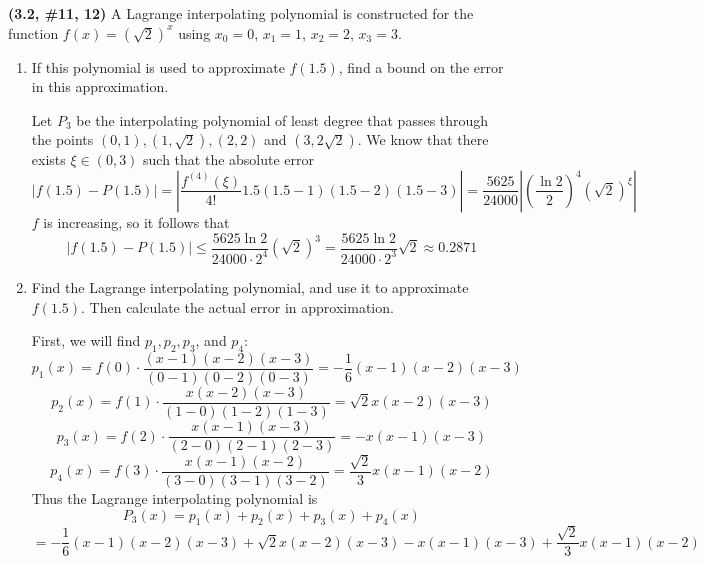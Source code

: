 \documentclass{eh-homework}
\begin{document}
    \begin{question}{6}
    \textbf{(3.2, \#11, 12)} A Lagrange interpolating polynomial is constructed for the function \(f(x) = (\sqrt{2})^x\) using \(x_0 = 0\), \(x_1 = 1\), \(x_2 = 2\), \(x_3 = 3\).
    
    \begin{enumerate}[label=\alph*.]
        \item If this polynomial is used to approximate \(f(1.5)\), find a bound on the error in this approximation.
        
        Let \(P_3\) be the interpolating polynomial of least degree that passes through the points \((0, 1), (1, \sqrt{2}), (2,2)\) and \((3, 2\sqrt{2})\). We know that there exists \(\xi \in (0,3)\) such that the absolute error
        \[
            |f(1.5) - P(1.5)| = \left\vert \frac{f^{(4)}(\xi)}{4!} 1.5(1.5-1)(1.5-2)(1.5-3) \right\vert = \frac{5625}{24000}\left\vert \left(\frac{\ln 2}{2}\right)^4(\sqrt{2})^{\xi} \right\vert 
        \]
        \(f\) is increasing, so it follows that
        \[
            |f(1.5) - P(1.5)| \leq \frac{5625\ln 2}{24000 \cdot 2^4}(\sqrt{2})^3 = \frac{5625\ln 2}{24000 \cdot 2^3}\sqrt{2} \approx 0.2871
        \]
    
        \item Find the Lagrange interpolating polynomial, and use it to approximate \(f(1.5)\). Then calculate the actual error in approximation.
        
        First, we will find \(p_1, p_2, p_3\), and \(p_4\):
        \[
            p_1(x) = f(0)\cdot \frac{(x - 1)(x-2)(x-3)}{(0 - 1)(0 - 2)(0 - 3)} = -\frac{1}{6}(x-1)(x-2)(x-3)
        \]
        \[
            p_2(x) = f(1) \cdot \frac{x(x-2)(x-3)}{(1-0)(1-2)(1-3)} = \sqrt{2}x(x-2)(x-3)
        \]
        \[
            p_3(x) = f(2) \cdot \frac{x(x-1)(x-3)}{(2-0)(2-1)(2-3)} = -x(x-1)(x-3)
        \]
        \[
            p_4(x) = f(3) \cdot \frac{x(x-1)(x-2)}{(3-0)(3-1)(3-2)} = \frac{\sqrt{2}}{3}x(x-1)(x-2)
        \]
        Thus the Lagrange interpolating polynomial is
        \[
            P_3(x) = p_1(x) + p_2(x) + p_3(x) + p_4(x)
        \]
        \[
            = -\frac{1}{6}(x-1)(x-2)(x-3) + \sqrt{2}x(x-2)(x-3) - x(x-1)(x-3) + \frac{\sqrt{2}}{3}x(x-1)(x-2)
        \]
    \end{enumerate}
    \end{question}
\end{document}
